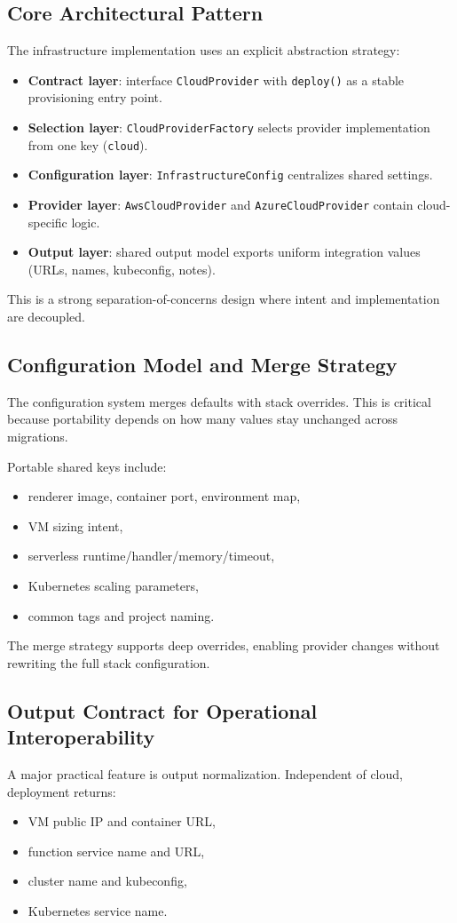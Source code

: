 \documentclass[conference]{IEEEtran}
\begin{document}
\subsection{Core Architectural Pattern}
The infrastructure implementation uses an explicit abstraction strategy:
\begin{itemize}
    \item \textbf{Contract layer}: interface \texttt{CloudProvider} with \texttt{deploy()} as a stable provisioning entry point.
    \item \textbf{Selection layer}: \texttt{CloudProviderFactory} selects provider implementation from one key (\texttt{cloud}).
    \item \textbf{Configuration layer}: \texttt{InfrastructureConfig} centralizes shared settings.
    \item \textbf{Provider layer}: \texttt{AwsCloudProvider} and \texttt{AzureCloudProvider} contain cloud-specific logic.
    \item \textbf{Output layer}: shared output model exports uniform integration values (URLs, names, kubeconfig, notes).
\end{itemize}

This is a strong separation-of-concerns design where intent and implementation are decoupled.

\subsection{Configuration Model and Merge Strategy}
The configuration system merges defaults with stack overrides. This is critical because portability depends on how many values stay unchanged across migrations.

Portable shared keys include:
\begin{itemize}
    \item renderer image, container port, environment map,
    \item VM sizing intent,
    \item serverless runtime/handler/memory/timeout,
    \item Kubernetes scaling parameters,
    \item common tags and project naming.
\end{itemize}

The merge strategy supports deep overrides, enabling provider changes without rewriting the full stack configuration.

\subsection{Output Contract for Operational Interoperability}
A major practical feature is output normalization. Independent of cloud, deployment returns:
\begin{itemize}
    \item VM public IP and container URL,
    \item function service name and URL,
    \item cluster name and kubeconfig,
    \item Kubernetes service name.
\end{itemize}
\end{document}
